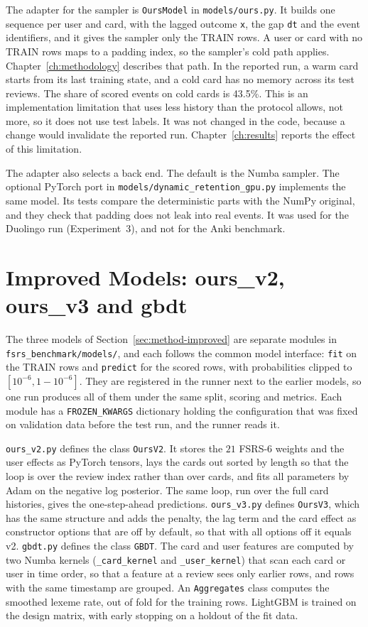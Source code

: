 The adapter for the sampler is \texttt{OursModel} in \texttt{models/ours.py}. It builds one sequence per
user and card, with the lagged outcome \texttt{x}, the gap \texttt{dt} and the event identifiers, and it
gives the sampler only the TRAIN rows. A user or card with no TRAIN rows maps to a padding index, so the
sampler's cold path applies. Chapter~\ref{ch:methodology} describes that path. In the reported run, a warm
card starts from its last training state, and a cold card has no memory across its test reviews. The
share of scored events on cold cards is 43.5\%. This is an implementation limitation that uses less
history than the protocol allows, not more, so it does not use test labels. It was not changed in the
code, because a change would invalidate the reported run. Chapter~\ref{ch:results} reports the effect
of this limitation.

The adapter also selects a back end. The default is the Numba sampler. The optional PyTorch port in
\texttt{models/\allowbreak dynamic\_retention\_gpu.py} implements the same model. Its tests compare the deterministic
parts with the NumPy original, and they check that padding does not leak into real events. It was used for the
Duolingo run (Experiment~3), and not for the Anki benchmark.

\section{Improved Models: ours\_v2, ours\_v3 and gbdt}
\label{sec:impl-improved}

The three models of Section~\ref{sec:method-improved} are separate modules in
\texttt{fsrs\_benchmark/\allowbreak models/}, and each follows the common model interface: \texttt{fit} on
the TRAIN rows and \texttt{predict} for the scored rows, with probabilities clipped to $[10^{-6}, 1-10^{-6}]$.
They are registered in the runner next to the earlier models, so one run produces all of them under the same
split, scoring and metrics. Each module has a \texttt{FROZEN\_KWARGS} dictionary holding the configuration
that was fixed on validation data before the test run, and the runner reads it.

\texttt{ours\_v2.py} defines the class \texttt{OursV2}. It stores the $21$ FSRS-6 weights and the user effects
as PyTorch tensors, lays the cards out sorted by length so that the loop is over the review index rather than
over cards, and fits all parameters by Adam on the negative log posterior. The same loop, run over the full
card histories, gives the one-step-ahead predictions. \texttt{ours\_v3.py} defines \texttt{OursV3}, which has
the same structure and adds the penalty, the lag term and the card effect as constructor options that are off by default,
so that with all options off it equals v2. \texttt{gbdt.py} defines the class \texttt{GBDT}. The card and user
features are computed by two Numba kernels (\texttt{\_card\_kernel} and \texttt{\_user\_kernel}) that scan each
card or user in time order, so that a feature at a review sees only earlier rows, and rows with the same
timestamp are grouped. An \texttt{Aggregates} class computes the smoothed lexeme rate, out of fold for the
training rows. LightGBM is trained on the design matrix, with early stopping on a holdout of the fit data.

